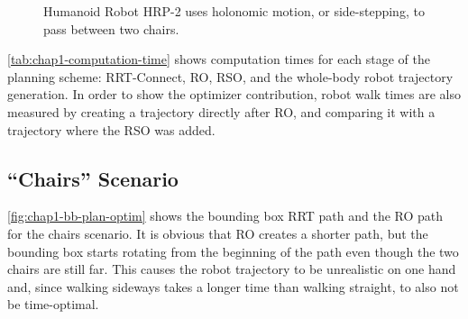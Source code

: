 \begin{figure}
  \caption{Humanoid Robot HRP-2 uses holonomic motion, or
    side-stepping, to pass between two chairs.}
  \label{fig:chap1-hrp2-chairs}
\end{figure}

\autoref{tab:chap1-computation-time} shows computation times for each stage
of the planning scheme: RRT-Connect, RO, RSO, and the whole-body robot
trajectory generation. In order to show the optimizer contribution,
robot walk times are also measured by creating a trajectory directly
after RO, and comparing it with a trajectory where the RSO was added.

\subsection{``Chairs'' Scenario}
\autoref{fig:chap1-bb-plan-optim} shows the bounding box RRT path
and the RO path for the chairs scenario. It is obvious that RO creates
a shorter path, but the bounding box starts rotating from the
beginning of the path even though the two chairs are still far. This
causes the robot trajectory to be unrealistic on one hand and, since
walking sideways takes a longer time than walking straight, to also
not be time-optimal.

